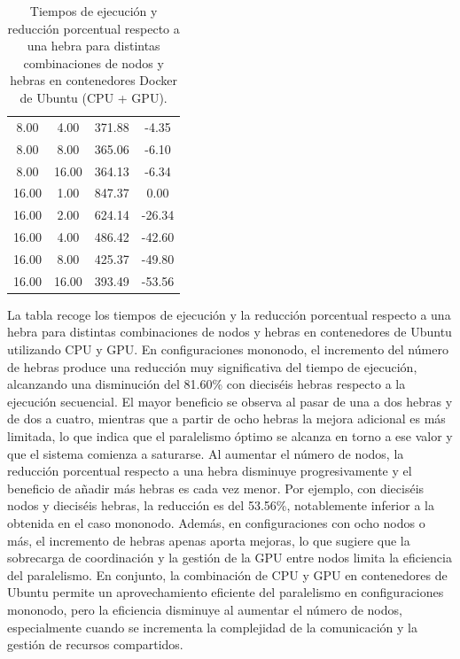 \begin{table}[ht]
\begin{tabular}{|c|c|c|c|}
        8.00           & 4.00            & 371.88              & -4.35                          \\
        8.00           & 8.00            & 365.06              & -6.10                          \\
        8.00           & 16.00           & 364.13              & -6.34                          \\
        16.00          & 1.00            & 847.37              & 0.00                           \\
        16.00          & 2.00            & 624.14              & -26.34                         \\
        16.00          & 4.00            & 486.42              & -42.60                         \\
        16.00          & 8.00            & 425.37              & -49.80                         \\
        16.00          & 16.00           & 393.49              & -53.56                         \\
        \hline
    \end{tabular}
    \caption{Tiempos de ejecución y reducción porcentual respecto a una hebra para distintas combinaciones de nodos y hebras en contenedores Docker de Ubuntu (CPU + GPU).}
    \label{tab:thread_sweep_ubuntu_docker_gpu_time}
\end{table}

La tabla recoge los tiempos de ejecución y la reducción porcentual respecto a una hebra para distintas combinaciones de nodos y hebras en contenedores de Ubuntu utilizando CPU y GPU. En configuraciones mononodo, el incremento del número de hebras produce una reducción muy significativa del tiempo de ejecución, alcanzando una disminución del 81.60\% con dieciséis hebras respecto a la ejecución secuencial. El mayor beneficio se observa al pasar de una a dos hebras y de dos a cuatro, mientras que a partir de ocho hebras la mejora adicional es más limitada, lo que indica que el paralelismo óptimo se alcanza en torno a ese valor y que el sistema comienza a saturarse. Al aumentar el número de nodos, la reducción porcentual respecto a una hebra disminuye progresivamente y el beneficio de añadir más hebras es cada vez menor. Por ejemplo, con dieciséis nodos y dieciséis hebras, la reducción es del 53.56\%, notablemente inferior a la obtenida en el caso mononodo. Además, en configuraciones con ocho nodos o más, el incremento de hebras apenas aporta mejoras, lo que sugiere que la sobrecarga de coordinación y la gestión de la GPU entre nodos limita la eficiencia del paralelismo. En conjunto, la combinación de CPU y GPU en contenedores de Ubuntu permite un aprovechamiento eficiente del paralelismo en configuraciones mononodo, pero la eficiencia disminuye al aumentar el número de nodos, especialmente cuando se incrementa la complejidad de la comunicación y la gestión de recursos compartidos.

